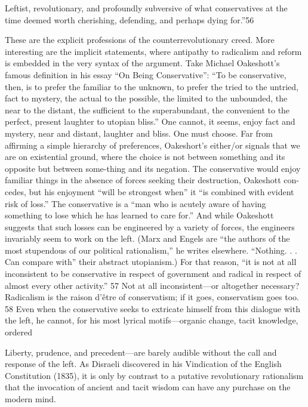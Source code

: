  \par 
Leftist, revolutionary, and profoundly subversive of what conservatives at the time deemed worth cherishing, defending, and perhaps dying for.”{\color{blue}56}
 \par 
These are the explicit professions of the counterrevolutionary creed. More interesting are the implicit statements, where antipathy to radicalism and reform is embedded in the very syntax of the argument. Take Michael Oakeshott’s famous definition in his essay “On Being Conservative”: “To be conservative, then, is to prefer the familiar to the unknown, to prefer the tried to the untried, fact to mystery, the actual to the possible, the limited to the unbounded, the near to the distant, the sufficient to the superabundant, the convenient to the perfect, present laughter to utopian bliss.” One cannot, it seems, enjoy fact and mystery, near and distant, laughter and bliss. One must choose. Far from affirming a simple hierarchy of preferences, Oakeshort’s either/or signals that we are on existential ground, where the choice is not between something and its opposite but between some-thing and its negation. The conservative would enjoy familiar things in the absence of forces seeking their destruction, Oakeshott con-cedes, but his enjoyment “will be strongest when” it “is combined with evident risk of loss.” The conservative is a “man who is acutely aware of having something to lose which he has learned to care for.” And while Oakeshott suggests that such losses can be engineered by a variety of forces, the engineers invariably seem to work on the left. (Marx and Engels are “the authors of the most stupendous of our political rationalism,” he writes elsewhere. “Nothing. . . Can compare with” their abstract utopianism.) For that reason, “it is not at all inconsistent to be conservative in respect of government and radical in respect of almost every other activity.” {\color{blue}57} Not at all inconsistent—or altogether necessary? Radicalism is the raison d’être of conservatism; if it goes, conservatism goes too. {\color{blue}58} Even when the conservative seeks to extricate himself from this dialogue with the left, he cannot, for his most lyrical motifs—organic change, tacit knowledge, ordered
 \par 
Liberty, prudence, and precedent—are barely audible without the call and response of the left. As Disraeli discovered in his Vindication of the English Constitution (1835), it is only by contrast to a putative revolutionary rationalism that the invocation of ancient and tacit wisdom can have any purchase on the modern mind.
